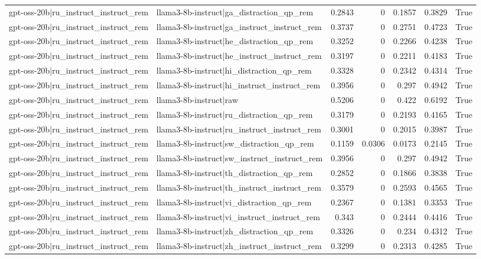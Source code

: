 \begin{table}
\begin{tabular}{l l r r r r l}
gpt-oss-20b|ru_instruct_instruct_rem & llama3-8b-instruct|ga_distraction_qp_rem & 0.2843 & 0 & 0.1857 & 0.3829 & True \\
gpt-oss-20b|ru_instruct_instruct_rem & llama3-8b-instruct|ga_instruct_instruct_rem & 0.3737 & 0 & 0.2751 & 0.4723 & True \\
gpt-oss-20b|ru_instruct_instruct_rem & llama3-8b-instruct|he_distraction_qp_rem & 0.3252 & 0 & 0.2266 & 0.4238 & True \\
gpt-oss-20b|ru_instruct_instruct_rem & llama3-8b-instruct|he_instruct_instruct_rem & 0.3197 & 0 & 0.2211 & 0.4183 & True \\
gpt-oss-20b|ru_instruct_instruct_rem & llama3-8b-instruct|hi_distraction_qp_rem & 0.3328 & 0 & 0.2342 & 0.4314 & True \\
gpt-oss-20b|ru_instruct_instruct_rem & llama3-8b-instruct|hi_instruct_instruct_rem & 0.3956 & 0 & 0.297 & 0.4942 & True \\
gpt-oss-20b|ru_instruct_instruct_rem & llama3-8b-instruct|raw & 0.5206 & 0 & 0.422 & 0.6192 & True \\
gpt-oss-20b|ru_instruct_instruct_rem & llama3-8b-instruct|ru_distraction_qp_rem & 0.3179 & 0 & 0.2193 & 0.4165 & True \\
gpt-oss-20b|ru_instruct_instruct_rem & llama3-8b-instruct|ru_instruct_instruct_rem & 0.3001 & 0 & 0.2015 & 0.3987 & True \\
gpt-oss-20b|ru_instruct_instruct_rem & llama3-8b-instruct|sw_distraction_qp_rem & 0.1159 & 0.0306 & 0.0173 & 0.2145 & True \\
gpt-oss-20b|ru_instruct_instruct_rem & llama3-8b-instruct|sw_instruct_instruct_rem & 0.3956 & 0 & 0.297 & 0.4942 & True \\
gpt-oss-20b|ru_instruct_instruct_rem & llama3-8b-instruct|th_distraction_qp_rem & 0.2852 & 0 & 0.1866 & 0.3838 & True \\
gpt-oss-20b|ru_instruct_instruct_rem & llama3-8b-instruct|th_instruct_instruct_rem & 0.3579 & 0 & 0.2593 & 0.4565 & True \\
gpt-oss-20b|ru_instruct_instruct_rem & llama3-8b-instruct|vi_distraction_qp_rem & 0.2367 & 0 & 0.1381 & 0.3353 & True \\
gpt-oss-20b|ru_instruct_instruct_rem & llama3-8b-instruct|vi_instruct_instruct_rem & 0.343 & 0 & 0.2444 & 0.4416 & True \\
gpt-oss-20b|ru_instruct_instruct_rem & llama3-8b-instruct|zh_distraction_qp_rem & 0.3326 & 0 & 0.234 & 0.4312 & True \\
gpt-oss-20b|ru_instruct_instruct_rem & llama3-8b-instruct|zh_instruct_instruct_rem & 0.3299 & 0 & 0.2313 & 0.4285 & True \\

\end{tabular}
\end{table}
